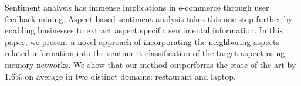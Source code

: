 Sentiment analysis has immense implications in e-commerce through user feedback mining. Aspect-based sentiment analysis takes this one step further by enabling businesses to extract aspect specific sentimental information. In this paper, we present a novel approach of incorporating the neighboring aspects related information into the sentiment classification of the target aspect using memory networks. We show that our method outperforms the state of the art by 1.6\% on average in two distinct domains: restaurant and laptop.
